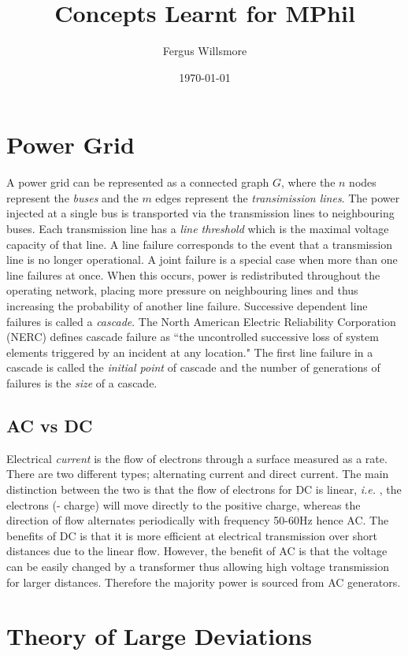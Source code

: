 \documentclass{article}
\title{Concepts Learnt for MPhil}
\author{Fergus Willsmore}
\date{\today}
\newcommand{\ie}{\textit{i.e. }}
\begin{document}
\maketitle

\newpage

\tableofcontents

\newpage

\section{Power Grid}

A power grid can be represented as a connected graph $G$, where the $n$ nodes represent the \textit{buses} and the $m$ edges represent the \textit{transimission lines}. The power injected at a single bus is transported via the transmission lines to neighbouring buses. Each transmission line has a {\it line threshold} which is the maximal voltage capacity of that line. A line failure corresponds to the event that a transmission line is no longer operational. A joint failure is a special case when more than one line failures at once. When this occurs, power is redistributed throughout the operating network, placing more pressure on neighbouring lines and thus increasing the probability of another line failure. Successive dependent line failures is called a \textit{cascade}. The North American Electric Reliability Corporation (NERC) defines cascade failure as ``the uncontrolled successive loss of system elements triggered by an incident at any location." The first line failure in a cascade is called the {\it initial point} of cascade and the number of generations of failures is the {\it size} of a cascade.

\subsection{AC vs DC}

Electrical {\it current} is the flow of electrons through a surface measured as a rate. There are two different types; alternating current and direct current. The main distinction between the two is that the flow of electrons for DC is linear, \ie, the electrons (- charge) will move directly to the positive charge, whereas the direction of flow alternates periodically with frequency 50-60Hz hence AC. The benefits of DC is that it is more efficient at electrical transmission over short distances due to the linear flow. However, the benefit of AC is that the voltage can be easily changed by a transformer thus allowing high voltage transmission for larger distances. Therefore the majority power is sourced from AC generators.



\section{Theory of Large Deviations}
\end{document}
